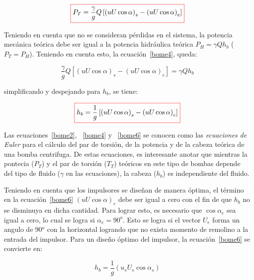 \documentclass[11pt, oneside]{article}
\begin{document}
\begin{equation}
\color{red}\boxed{\color{black} P_T =  \frac{\gamma}{g} Q \left[ \left( u U \cos \alpha \right)_{s} -  \left( u U \cos \alpha  \right)_{e} \right] }
\label{bome4}
\end{equation}

Teniendo en cuenta que no se consideran p\'erdidas en el sistema, la potencia mec\'anica te\'orica debe ser igual a la potencia hidr\'aulica te\'orica $P_H = \gamma Q h_b$ ($P_T = P_H$). Teniendo en cuenta esto, la ecuaci\'on~\ref{bome4}, queda:

\begin{equation}
 \frac{\gamma}{g} Q \left[ \left( u U \cos \alpha \right)_{s} -  \left( u U \cos \alpha  \right)_{e} \right] = \gamma Q h_b
\label{bome5}
\end{equation}

simplificando y despejando para $h_b$, se tiene:

\begin{equation}
\color{red}\boxed{\color{black} h_b= \frac{1}{g}  \left[ \left( u U \cos \alpha \right)_{s} -  \left( u U \cos \alpha  \right)_{e} \right] }
\label{bome6}
\end{equation}

Las ecuaciones~\ref{bome2}, ~\ref{bome4} y ~\ref{bome6} se conocen como las \emph{ecuaciones de Euler} para el c\'alculo del par de torsi\'on, de la potencia y de la cabeza te\'orica de una bomba centrifuga. De estas ecuaciones, es interesante anotar que mientras  la pontecia ($P_T$) y el par de torsi\'on ($T_T$) te\'oricos en este tipo de bombas depende del tipo de fluido ($\gamma$ en las ecuaciones), la cabeza ($h_b$) es independiente del fluido.

Teniendo en cuenta que los impulsores se dise\~nan de manera \'optima, el t\'ermino en la ecuaci\'on~\ref{bome6} $\left( u U \cos \alpha  \right)_{e}$ debe ser igual a cero con el fin de que $h_b$ no se disminuya en dicha cantidad. Para lograr esto, es necesario que $\cos \alpha_e$ sea igual a cero, lo cual se logra si $\alpha_e = 90^o$. Esto se logra si el vector $U_e$ forma un angulo de 90$^o$ con la horizontal logrando que no exista momento de remolino a la entrada del impulsor. Para un dise\~no \'optimo del impulsor, la ecuaci\'on~\ref{bome6} se convierte en:

\begin{equation}
 h_b= \frac{1}{g}  \left( u_s U_s \cos \alpha_s \right) 
\label{bome7}
\end{equation}
\end{document}
